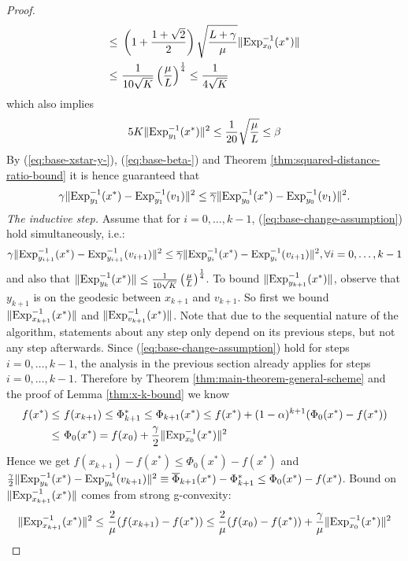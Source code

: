 \begin{proof}
\begin{align}
	\nonumber\le ~& \left(1 + \frac{1+\sqrt{2}}{2}\right)\sqrt{\frac{L+\gamma}{\mu}}\|\mathrm{Exp}_{x_0}^{-1}(x^*)\| \\
	\le ~& \frac{1}{10\sqrt{K}}\left(\frac{\mu}{L}\right)^{\frac{1}{4}} 
	\le \frac{1}{4\sqrt{K}} \label{eq:base-xstar-y-}
	\end{align}
	which also implies
	\begin{equation}
	5K\|\mathrm{Exp}_{y_1}^{-1}(x^*)\|^2 \le \frac{1}{20}\sqrt{\frac{\mu}{L}} \le \beta \label{eq:base-beta-}
	\end{equation}
	By (\ref{eq:base-xstar-y-}), (\ref{eq:base-beta-}) and Theorem \ref{thm:squared-distance-ratio-bound} it is hence guaranteed that 
	$$\gamma \| \mathrm{Exp}_{y_1}^{-1}(x^*) -\mathrm{Exp}_{y_1}^{-1}(v_1)\|^2 \le \overline{\gamma} \|\mathrm{Exp}_{y_0}^{-1}(x^*)-\mathrm{Exp}_{y_0}^{-1}(v_1)\|^2.$$
	\emph{The inductive step.}
	Assume that for $i=0,\dots,k-1$, (\ref{eq:base-change-assumption}) hold simultaneously, i.e.:
	$$\gamma \| \mathrm{Exp}_{y_{i+1}}^{-1}(x^*) -\mathrm{Exp}_{y_{i+1}}^{-1}(v_{i+1})\|^2 \le \overline{\gamma}\|\mathrm{Exp}_{y_i}^{-1}(x^*)-\mathrm{Exp}_{y_i}^{-1}(v_{i+1})\|^2, \forall i=0,\dots,k-1$$
	and also that $\|\mathrm{Exp}_{y_k}^{-1}(x^*)\|\le \frac{1}{10\sqrt{K}}\left(\frac{\mu}{L}\right)^{\frac{1}{4}}$. 
	To bound $\|\mathrm{Exp}_{y_{k+1}}^{-1}(x^*)\|$, observe that $y_{k+1}$ is on the geodesic between $x_{k+1}$ and $v_{k+1}$. So first we bound $\|\mathrm{Exp}_{x_{k+1}}^{-1}(x^*)\|$ and $\|\mathrm{Exp}_{v_{k+1}}^{-1}(x^*)\|$.
	Note that due to the sequential nature of the algorithm, statements about any step only depend on its previous steps, but not any step afterwards. 
	Since (\ref{eq:base-change-assumption}) hold for steps $i=0,\dots,k-1$, the analysis in the previous section already applies for steps $i=0,\dots,k-1$. Therefore by Theorem  \ref{thm:main-theorem-general-scheme} and the proof of Lemma \ref{thm:x-k-bound} we know 
	\begin{align*}
	f(x^*)\le &~ f(x_{k+1})\le\Phi_{k+1}^*\le\Phi_{k+1}(x^*)
	\le f(x^*)+(1-\alpha)^{k+1}(\Phi_0(x^*)-f(x^*)) \\
	\le &~ \Phi_0(x^*) = f(x_0)+\frac{\gamma}{2}\|\mathrm{Exp}_{x_0}^{-1}(x^*)\|^2
	\end{align*}
	Hence we get $f(x_{k+1})-f(x^*)\le\Phi_0(x^*)-f(x^*)$ and $\frac{\gamma}{2}\|\mathrm{Exp}_{y_k}^{-1}(x^*)-\mathrm{Exp}_{y_k}^{-1}(v_{k+1})\|^2\equiv\overline{\Phi}_{k+1}(x^*)-\Phi_{k+1}^*\le\Phi_0(x^*)-f(x^*)$. Bound on $\|\mathrm{Exp}_{x_{k+1}}^{-1}(x^*)\|$ comes from strong g-convexity:
	\begin{align*}
	\|\Exp_{x_{k+1}}^{-1}(x^*)\|^2\le &~ \frac{2}{\mu}(f(x_{k+1})-f(x^*))\le \frac{2}{\mu}(f(x_0)-f(x^*))+\frac{\gamma}{\mu}\|\Exp_{x_0}^{-1}(x^*)\|^2 \\

\end{align*}
\end{proof}
